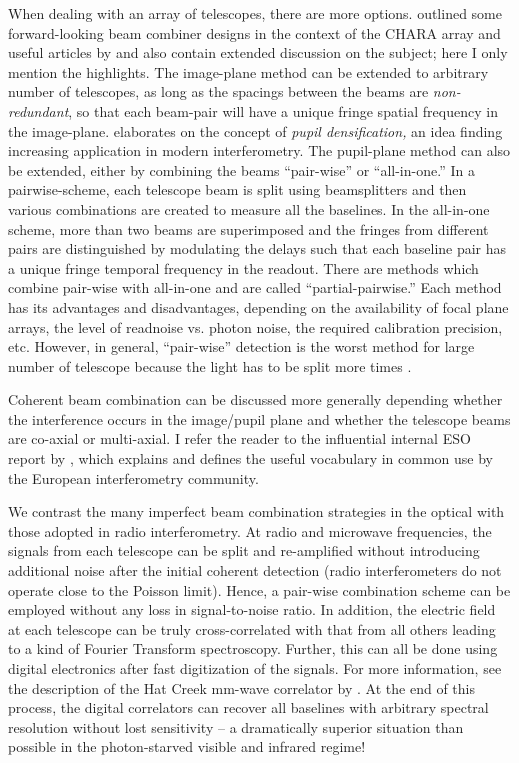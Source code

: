 \documentclass[12pt]{article}
\begin{document}
When dealing with an array of telescopes, there are more options.
\citet{brummelaar1993} outlined some forward-looking beam combiner
designs in the context of the CHARA array and useful articles
by \citet{mozurk2000} and \citet{mariotti1992} also contain extended
discussion on the subject; here I only mention the highlights.  The
image-plane method can be extended to arbitrary number of telescopes,
as long as the spacings between the beams are {\em non-redundant}, so
that each beam-pair will have a unique fringe spatial frequency in the
image-plane.  \citet{labeyrie1996} elaborates on the concept of
{\em pupil densification,} an idea finding increasing application in
modern interferometry.  The pupil-plane method can also be extended,
either by combining the beams ``pair-wise'' or ``all-in-one.''  In a
pairwise-scheme, each telescope beam is split using beamsplitters and
then various combinations are created to measure all the baselines.
In the all-in-one scheme, more than two beams are superimposed and the
fringes from different pairs are distinguished by modulating the
delays such that each baseline pair has a unique fringe temporal
frequency in the readout.  There are methods which combine pair-wise
with all-in-one and are called ``partial-pairwise.''  Each method has
its advantages and disadvantages, depending on the availability of
focal plane arrays, the level of readnoise vs. photon noise, the
required calibration precision, etc.  However, in general,
``pair-wise'' detection is the worst method for large number of
telescope because the light has to be split more times
\citep[see][although beware of some important simplifications made in
this analysis]{buscher_thesis}.

Coherent beam combination can be discussed more generally depending 
whether the interference occurs in the image/pupil plane and whether the
telescope beams are co-axial or multi-axial.  I refer the reader to
the influential internal ESO report by \citet{mariotti1992}, which
explains and defines the useful vocabulary in common use by the European
interferometry community.

We contrast the many imperfect beam combination strategies in the
optical with those adopted in radio interferometry.  At radio and
microwave frequencies, the signals from each telescope can be split
and re-amplified without introducing additional noise after the
initial coherent detection (radio interferometers do not operate
close to the Poisson limit).  Hence, a pair-wise combination
scheme can be employed without any loss in signal-to-noise ratio.  In
addition, the electric field at each telescope can be truly
cross-correlated with that from all others leading to a kind of Fourier
Transform spectroscopy.  Further, this can all be done using digital
electronics after fast digitization of the signals.  For more
information, see the description of the Hat Creek mm-wave
correlator by \citet{hudson85}.  At the end of this process, the
digital correlators can recover all baselines with arbitrary spectral
resolution without lost sensitivity -- a dramatically superior
situation than possible in the photon-starved visible and infrared
regime!
\end{document}
